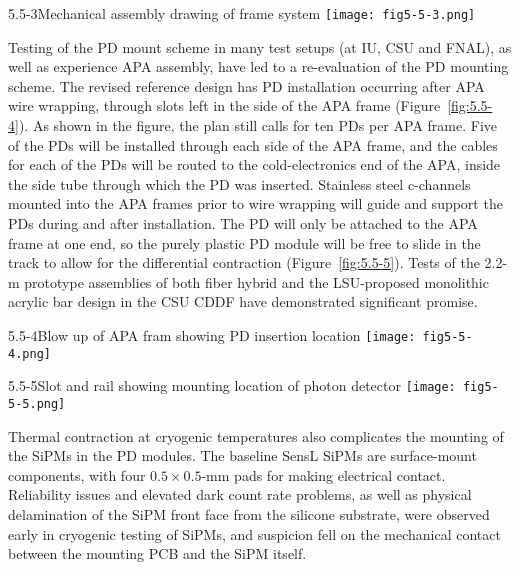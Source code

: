 \begin{cdrfigure}{5.5-3}{Mechanical assembly drawing of frame system}
  \texttt{[image: fig5-5-3.png]}
\end{cdrfigure}

Testing of the PD mount scheme in many test setups (at IU, CSU and
FNAL), as well as experience APA assembly, have led to a re-evaluation
of the PD mounting scheme.  The revised reference design has PD
installation occurring after APA wire wrapping, through slots left in
the side of the APA frame (Figure~\ref{fig:5.5-4}).  As shown in the
figure, the plan still calls for ten PDs per APA frame.  Five of the
PDs will be installed through each side of the APA frame, and the
cables for each of the PDs will be routed to the cold-electronics end
of the APA, inside the side tube through which the PD was inserted.
Stainless steel c-channels mounted into the APA frames prior to wire
wrapping will guide and support the PDs during and after installation.
The PD will only be attached to the APA frame at one end, so the
purely plastic PD module will be free to slide in the track to allow
for the differential contraction (Figure~\ref{fig:5.5-5}).  Tests of
the 2.2-m prototype assemblies of both fiber hybrid and the
LSU-proposed monolithic acrylic bar design in the CSU CDDF have
demonstrated significant promise.

\begin{cdrfigure}{5.5-4}{Blow up of APA fram showing PD insertion location}
  \texttt{[image: fig5-5-4.png]}
\end{cdrfigure}

\begin{cdrfigure}{5.5-5}{Slot and rail showing mounting location of photon detector}
  \texttt{[image: fig5-5-5.png]}
\end{cdrfigure}

Thermal contraction at cryogenic temperatures also complicates the
mounting of the SiPMs in the PD modules.  The baseline SensL SiPMs are
surface-mount components, with four $0.5\times0.5$-mm pads for making
electrical contact.  Reliability issues and elevated dark count rate
problems, as well as physical delamination of the SiPM front face from
the silicone substrate, were observed early in cryogenic testing of
SiPMs, and suspicion fell on the mechanical contact between the
mounting PCB and the SiPM itself.

